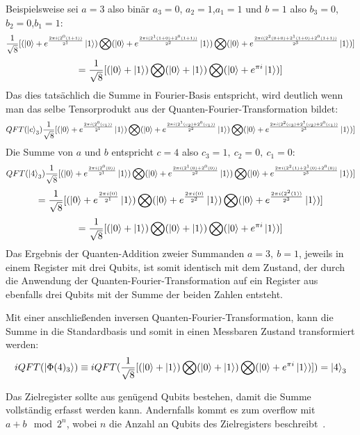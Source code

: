 Beispielsweise sei \(a = 3\) also binär \(a_3 = 0\), \(a_2 = 1\),\(a_1 = 1\) und 
\(b = 1\) also \(b_3 = 0\), \(b_2 = 0\),\(b_1 = 1\):
\[
\frac{1}{\sqrt{8}} [ (\ket{0} + { e^{\frac{2 \pi i (2^0(1+1))}{2^1}}}\ket{1} ) \bigotimes
( \ket{0} + { e^{\frac{2 \pi i (2^1(1+0)+2^0(1+1))}{2^2}}}\ket{1} ) \bigotimes
( \ket{0} + { e^{\frac{2 \pi i (2^{2}(0+0) +2^1(1+0)+2^0(1+1))}{2^3}}}\ket{1} ) ]
\]
\[
=\frac{1}{\sqrt{8}} [ (\ket{0} + \ket{1} ) \bigotimes
( \ket{0} +   \ket{1} ) \bigotimes
( \ket{0} +  e^{\pi i }\ket{1} ) ]
\]
Das dies tatsächlich die Summe in Fourier-Basis entspricht, 
wird deutlich wenn man das selbe Tensorprodukt aus der Quanten-Fourier-Transformation bildet:
\[
    QFT(\ket{c}_3)
    \frac{1}{\sqrt{8}} [ (\ket{0} + { e^{\frac{2 \pi i (2^0(c_1))}{2^1}}}\ket{1} ) \bigotimes
( \ket{0} + { e^{\frac{2 \pi i (2^1(c_2)+2^0(c_1))}{2^2}}}\ket{1} ) \bigotimes
( \ket{0} + { e^{\frac{2 \pi i (2^{2}(c_3) +2^1(c_2)+2^0(c_1))}{2^3}}}\ket{1} ) ]
\]
Die Summe von \(a\) und \(b\) entspricht \(c = 4\) also \(c_3 = 1,~c_2 = 0,~c_1=0\):
\[
    QFT(\ket{4}_3)
    \frac{1}{\sqrt{8}} [ (\ket{0} + { e^{\frac{2 \pi i (2^0(0))}{2^1}}}\ket{1} ) \bigotimes
( \ket{0} + { e^{\frac{2 \pi i (2^1(0)+2^0(0))}{2^2}}}\ket{1} ) \bigotimes
( \ket{0} + { e^{\frac{2 \pi i (2^{2}(1) +2^1(0)+2^0(0))}{2^3}}}\ket{1} ) ]
\]
\[
    = 
    \frac{1}{\sqrt{8}} [ (\ket{0} + { e^{\frac{2 \pi i (0)}{2^1}}}\ket{1} ) \bigotimes
( \ket{0} + { e^{\frac{2 \pi i (0)}{2^2}}}\ket{1} ) \bigotimes
( \ket{0} + { e^{\frac{2 \pi i (2^{2}(1))}{2^3}}}\ket{1} ) ]
\]
\[
=\frac{1}{\sqrt{8}} [ (\ket{0} + \ket{1} ) \bigotimes
( \ket{0} +   \ket{1} ) \bigotimes
( \ket{0} +  e^{\pi i }\ket{1} ) ]
\]
Das Ergebnis der Quanten-Addition zweier Summanden \(a=3,~b=1\), 
jeweils in einem Register mit drei Qubits,
ist somit identisch mit dem Zustand, 
der durch die Anwendung der Quanten-Fourier-Transformation auf ein Register 
aus ebenfalls drei Qubits mit der Summe der beiden Zahlen entsteht.

Mit einer anschließenden inversen Quanten-Fourier-Transformation, 
kann die Summe in die Standardbasis und somit in einen Messbaren Zustand transformiert werden:
\[
iQFT(\ket{\Phi(4)_3})
\equiv
 iQFT(\frac{1}{\sqrt{8}} [ (\ket{0} + \ket{1} ) \bigotimes
( \ket{0} +   \ket{1} ) \bigotimes
( \ket{0} +  e^{\pi i }\ket{1} ) ]) 
=
\ket{4}_3
\]

Das Zielregister sollte aus genügend Qubits bestehen, 
damit die Summe vollständig erfasst werden kann.
Andernfalls kommt es zum overflow mit \(a + b \mod 2^n\), 
wobei \(n\) die Anzahl an Qubits des Zielregisters beschreibt~\cite{beauregard2003circuit}.

